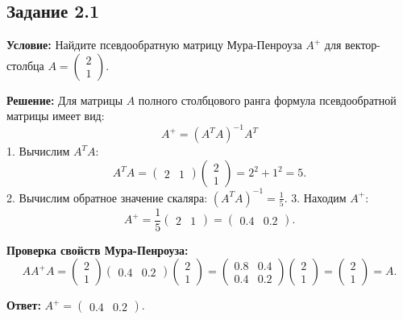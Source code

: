 \documentclass[11pt, a4paper]{article}
\begin{document}
\subsection*{Задание 2.1}
\textbf{Условие:} Найдите псевдообратную матрицу Мура-Пенроуза $A^+$ для вектор-столбца $A = \begin{pmatrix} 2 \\ 1 \end{pmatrix}$.

\textbf{Решение:}
Для матрицы $A$ полного столбцового ранга формула псевдообратной матрицы имеет вид:
$$ A^+ = (A^T A)^{-1} A^T $$
1. Вычислим $A^T A$:
$$ A^T A = \begin{pmatrix} 2 & 1 \end{pmatrix} \begin{pmatrix} 2 \\ 1 \end{pmatrix} = 2^2 + 1^2 = 5. $$
2. Вычислим обратное значение скаляра: $(A^T A)^{-1} = \frac{1}{5}$.
3. Находим $A^+$:
$$ A^+ = \frac{1}{5} \begin{pmatrix} 2 & 1 \end{pmatrix} = \begin{pmatrix} 0.4 & 0.2 \end{pmatrix}. $$

\textbf{Проверка свойств Мура-Пенроуза:}
$$ A A^+ A = \begin{pmatrix} 2 \\ 1 \end{pmatrix} \begin{pmatrix} 0.4 & 0.2 \end{pmatrix} \begin{pmatrix} 2 \\ 1 \end{pmatrix} = \begin{pmatrix} 0.8 & 0.4 \\ 0.4 & 0.2 \end{pmatrix} \begin{pmatrix} 2 \\ 1 \end{pmatrix} = \begin{pmatrix} 2 \\ 1 \end{pmatrix} = A. $$

\textbf{Ответ:} $A^+ = \begin{pmatrix} 0.4 & 0.2 \end{pmatrix}$.

\newpage

\end{document}
